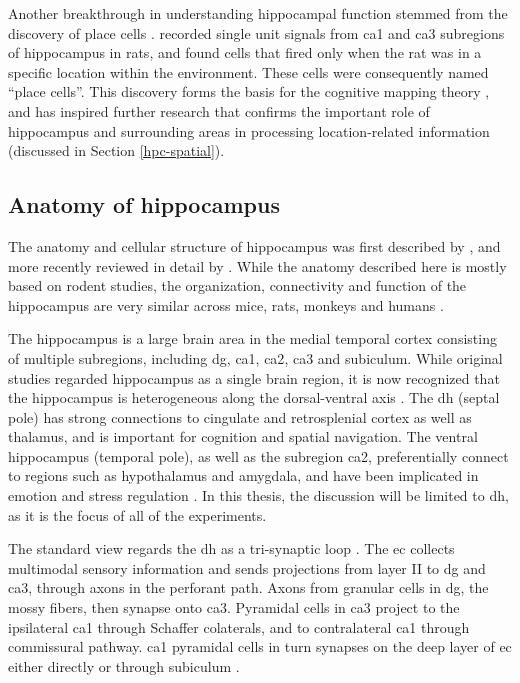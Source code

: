 Another breakthrough in understanding hippocampal function stemmed from the discovery of place cells \citep{o'keefe71}. \citet{o'keefe71} recorded single unit signals from \gls{ca1} and \gls{ca3} subregions of hippocampus in rats, and found cells that fired only when the rat was in a specific location within the environment. These cells were consequently named ``place cells''. This discovery forms the basis for the cognitive mapping theory \citep{o'keefe76}, and has inspired further research that confirms the important role of hippocampus and surrounding areas in processing location-related information (discussed in Section \ref{hpc-spatial}).

\subsection{Anatomy of hippocampus}
The anatomy and cellular structure of hippocampus was first described by \citet{cajal93}, and more recently reviewed in detail by \citet{strien09}. While the anatomy described here is mostly based on rodent studies, the organization, connectivity and function of the hippocampus are very similar across mice, rats, monkeys and humans \citep{clark13}. 

The hippocampus is a large brain area in the medial temporal cortex consisting of multiple subregions, including \gls{dg}, \gls{ca1}, \gls{ca2}, \gls{ca3} and subiculum. While original studies regarded hippocampus as a single brain region, it is now recognized that the hippocampus is heterogeneous along the dorsal-ventral axis \citep{moser98, fanselow10}. The \gls{dh} (septal pole) has strong connections to cingulate and retrosplenial cortex as well as thalamus, and is important for cognition and spatial navigation. The ventral hippocampus (temporal pole), as well as the subregion \gls{ca2}, preferentially connect to regions such as hypothalamus and amygdala, and have been implicated in emotion and stress regulation \citep{fanselow10, chevaleyre16}. In this thesis, the discussion will be limited to \gls{dh}, as it is the focus of all of the experiments.

The standard view regards the \gls{dh} as a tri-synaptic loop \citep{strien09}. The \gls{ec} collects multimodal sensory information and sends projections from layer II to \gls{dg} and \gls{ca3}, through axons in the perforant path. Axons from granular cells in \gls{dg}, the mossy fibers, then synapse onto \gls{ca3}. Pyramidal cells in \gls{ca3} project to the ipsilateral \gls{ca1} through Schaffer colaterals, and to contralateral \gls{ca1} through commissural pathway. \gls{ca1} pyramidal cells in turn synapses on the deep layer of \gls{ec} either directly or through subiculum \citep{strien09}.

